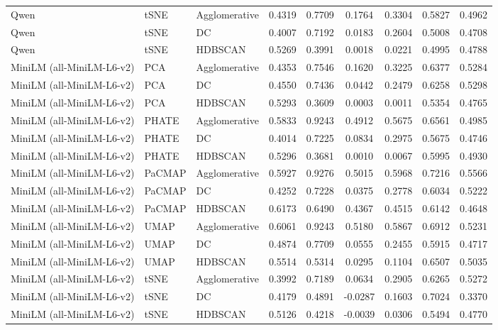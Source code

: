 \begin{table}[t]
\begin{tabular}{lllcccccc}
Qwen & tSNE & Agglomerative & 0.4319 & 0.7709 & 0.1764 & 0.3304 & 0.5827 & 0.4962 \\
Qwen & tSNE & DC & 0.4007 & 0.7192 & 0.0183 & 0.2604 & 0.5008 & 0.4708 \\
Qwen & tSNE & HDBSCAN & 0.5269 & 0.3991 & 0.0018 & 0.0221 & 0.4995 & 0.4788 \\

MiniLM (all-MiniLM-L6-v2) & PCA & Agglomerative & 0.4353 & 0.7546 & 0.1620 & 0.3225 & 0.6377 & 0.5284 \\
MiniLM (all-MiniLM-L6-v2) & PCA & DC & 0.4550 & 0.7436 & 0.0442 & 0.2479 & 0.6258 & 0.5298 \\
MiniLM (all-MiniLM-L6-v2) & PCA & HDBSCAN & 0.5293 & 0.3609 & 0.0003 & 0.0011 & 0.5354 & 0.4765 \\

MiniLM (all-MiniLM-L6-v2) & PHATE & Agglomerative & 0.5833 & 0.9243 & 0.4912 & 0.5675 & 0.6561 & 0.4985 \\
MiniLM (all-MiniLM-L6-v2) & PHATE & DC & 0.4014 & 0.7225 & 0.0834 & 0.2975 & 0.5675 & 0.4746 \\
MiniLM (all-MiniLM-L6-v2) & PHATE & HDBSCAN & 0.5296 & 0.3681 & 0.0010 & 0.0067 & 0.5995 & 0.4930 \\

MiniLM (all-MiniLM-L6-v2) & PaCMAP & Agglomerative & 0.5927 & 0.9276 & 0.5015 & 0.5968 & 0.7216 & 0.5566 \\
MiniLM (all-MiniLM-L6-v2) & PaCMAP & DC & 0.4252 & 0.7228 & 0.0375 & 0.2778 & 0.6034 & 0.5222 \\
MiniLM (all-MiniLM-L6-v2) & PaCMAP & HDBSCAN & 0.6173 & 0.6490 & 0.4367 & 0.4515 & 0.6142 & 0.4648 \\

MiniLM (all-MiniLM-L6-v2) & UMAP & Agglomerative & 0.6061 & 0.9243 & 0.5180 & 0.5867 & 0.6912 & 0.5231 \\
MiniLM (all-MiniLM-L6-v2) & UMAP & DC & 0.4874 & 0.7709 & 0.0555 & 0.2455 & 0.5915 & 0.4717 \\
MiniLM (all-MiniLM-L6-v2) & UMAP & HDBSCAN & 0.5514 & 0.5314 & 0.0295 & 0.1104 & 0.6507 & 0.5035 \\

MiniLM (all-MiniLM-L6-v2) & tSNE & Agglomerative & 0.3992 & 0.7189 & 0.0634 & 0.2905 & 0.6265 & 0.5272 \\
MiniLM (all-MiniLM-L6-v2) & tSNE & DC & 0.4179 & 0.4891 & -0.0287 & 0.1603 & 0.7024 & 0.3370 \\
MiniLM (all-MiniLM-L6-v2) & tSNE & HDBSCAN & 0.5126 & 0.4218 & -0.0039 & 0.0306 & 0.5494 & 0.4770 \\
\bottomrule
\end{tabular}
\end{table}
